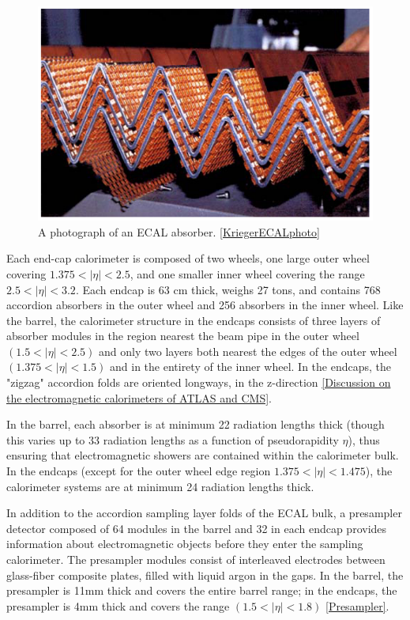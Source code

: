 \begin{figure}
  \includegraphics[width=\linewidth]{figures/detector_chapter/ECALphoto.png}
  \caption{A photograph of an ECAL absorber. \ref{KriegerECALphoto}}
  \label{fig:ECALphoto}
\end{figure}

Each end-cap calorimeter is composed of two wheels, one large outer wheel covering $ 1.375<| \eta |<2.5 $, and one smaller inner wheel covering the range $ 2.5<| \eta |<3.2 $. Each endcap is 63 cm thick, weighs 27 tons, and contains 768 accordion absorbers in the outer wheel and 256 absorbers in the inner wheel. Like the barrel, the calorimeter structure in the endcaps consists of three layers of absorber modules in the region nearest the beam pipe in the outer wheel $( 1.5 < |\eta | <2.5 )$ and only two layers both nearest the edges of the outer wheel $(1.375 < |\eta | < 1.5)$ and in the entirety of the inner wheel. In the endcaps, the "zigzag" accordion folds are oriented longways, in the z-direction \ref{Discussion on the electromagnetic calorimeters of ATLAS and CMS}.

In the barrel, each absorber is at minimum 22 radiation lengths thick (though this varies up to 33 radiation lengths as a function of pseudorapidity $\eta$), thus ensuring that electromagnetic showers are contained within the calorimeter bulk. In the endcaps (except for the outer wheel edge region  $ 1.375< | \eta |< 1.475 $), the calorimeter systems are at minimum 24 radiation lengths thick.

In addition to the accordion sampling layer folds of the ECAL bulk, a presampler detector composed of 64 modules in the barrel and 32 in each endcap provides information about electromagnetic objects before they enter the sampling calorimeter. The presampler modules consist of interleaved electrodes between glass-fiber composite plates, filled with liquid argon in the gaps. In the barrel, the presampler is 11mm thick and covers the entire barrel range; in the endcaps, the presampler is 4mm thick and covers the range $(1.5<| \eta |<1.8)$ \ref{Presampler}.

